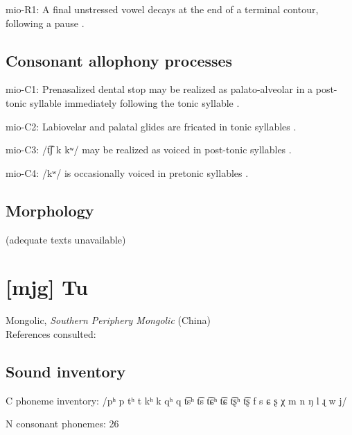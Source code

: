 {\begin{appendixdesc}
\item[mio-R1:] A final unstressed vowel decays at the end of a terminal contour, following a pause \citep[13]{Bradley1970}.
\end{appendixdesc}
\subsection*{Consonant allophony processes}
\begin{appendixdesc}

\item[mio-C1:] Prenasalized dental stop may be realized as palato-alveolar in a post-tonic syllable immediately following the tonic syllable \citep[6]{Bradley1970}.

\item[mio-C2:] Labiovelar and palatal glides are fricated in tonic syllables \citep[8]{Bradley1970}.

\item[mio-C3:] /t͡ʃ k kʷ/ may be realized as voiced in post-tonic syllables \citep[5]{Bradley1970}.

\item[mio-C4:] /kʷ/ is occasionally voiced in pretonic syllables \citep[5]{Bradley1970}.
\end{appendixdesc}
\subsection*{Morphology}

(adequate texts unavailable)

\section*{[mjg] Tu}   %
Mongolic, \textit{Southern Periphery Mongolic} (China)\medskip\\
References consulted: \citet{Slater2003}

\subsection*{Sound inventory}
\begin{appendixdesc}

\item[C phoneme inventory:] /pʰ p tʰ t kʰ k qʰ q t͡sʰ t͡s t͡ɕʰ t͡ɕ t͡ʂʰ t͡ʂ f s ɕ ʂ χ m n ŋ l ɻ w j/

\item[N consonant phonemes:] 26


\end{appendixdesc}}
